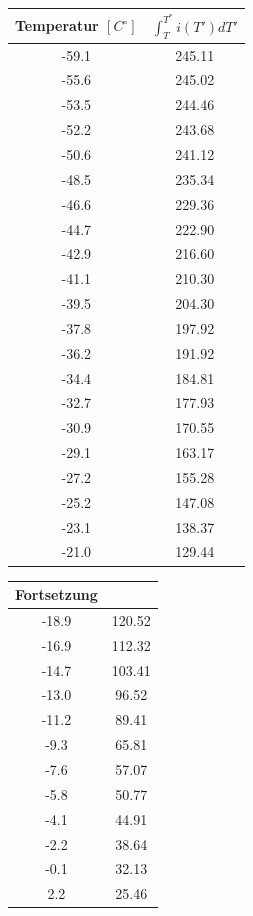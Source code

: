 \begin{table}[htbp]
\begin{minipage}[t]{0.45\textwidth}
\centering
\begin{tabular}{c|c}
Temperatur $[C^\circ]$ & $\int ^{T^*}_{T} i(T')dT'$\\\hline
-59.1 &245.11\\\hline
-55.6 &245.02\\\hline
-53.5 &244.46\\\hline
-52.2 &243.68\\\hline
-50.6 &241.12\\\hline
-48.5 &235.34\\\hline
-46.6 &229.36\\\hline
-44.7 &222.90\\\hline
-42.9 &216.60\\\hline
-41.1 &210.30\\\hline
-39.5 &204.30\\\hline
-37.8 &197.92\\\hline
-36.2 &191.92\\\hline
-34.4 &184.81\\\hline
-32.7 &177.93\\\hline
-30.9 &170.55\\\hline
-29.1 &163.17\\\hline
-27.2 &155.28\\\hline
-25.2 &147.08\\\hline
-23.1 &138.37\\\hline
-21.0 &129.44\\
\end{tabular}
\end{minipage}
\begin{minipage}[t]{0.45\textwidth}
\centering
\begin{tabular}{c|c}
Fortsetzung & \\\hline
-18.9 &120.52\\\hline
-16.9 &112.32\\\hline
-14.7 &103.41\\\hline
-13.0 &96.52\\\hline
-11.2 &89.41\\\hline
-9.3 &65.81\\\hline
-7.6 &57.07\\\hline
-5.8 &50.77\\\hline
-4.1 &44.91\\\hline
-2.2 &38.64\\\hline
-0.1 &32.13\\\hline
2.2 &25.46\\\hline

\end{tabular}
\end{minipage}
\end{table}
